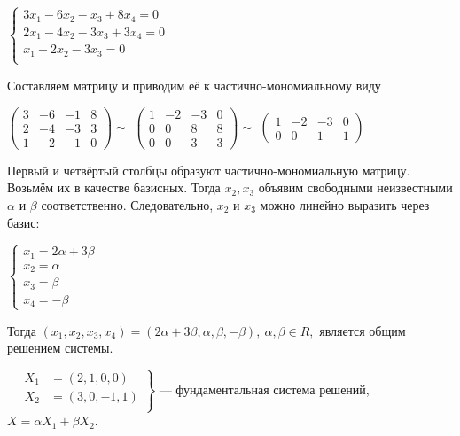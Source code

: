 \documentclass[a4paper, 12pt]{report}
\begin{document}
	$\begin{cases}
		3x_1-6x_2-x_3+8x_4=0 \\
		2x_1-4x_2-3x_3+3x_4=0 \\
		x_1-2x_2-3x_3=0 \\
	\end{cases}$
	\par\bigskip
	Составляем матрицу и приводим её к частично-мономиальному виду
	\par\bigskip
	$\begin{pmatrix} 3 & -6 & -1 & 8 \\ 2 & -4 & -3 & 3\\ 1 & -2 & -1 & 0 \end{pmatrix}\sim$
	$\begin{pmatrix} 1 & -2 & -3 & 0 \\ 0 & 0 & 8 & 8\\ 0 & 0 & 3 & 3 \end{pmatrix}\sim$
	$\begin{pmatrix} 1 & -2 & -3 & 0 \\ 0 & 0 & 1 & 1 \end{pmatrix}$
	\par\bigskip
	Первый и четвёртый столбцы образуют частично-мономиальную матрицу. Возьмём их в качестве базисных. Тогда $x_2, x_3$ объявим свободными неизвестными $\alpha$ и $\beta$ соответственно. Следовательно, $x_2$ и $x_3$ можно линейно выразить через базис:
	
	$\begin{cases}
		x_1 = 2\alpha + 3\beta \\
		x_2 = \alpha \\
		x_3 = \beta \\
		x_4 = -\beta
	\end{cases}$
	
	Тогда $(x_1,x_2,x_3,x_4) = (2\alpha + 3\beta, \alpha, \beta, -\beta), \ \alpha, \beta \in R,$ является общим решением системы.
	\par\bigskip
	$\quad\left.
	\begin{aligned}
		X_1 &= (2,1,0,0) \\
		X_2 &= (3,0,-1,1) \\
	\end{aligned}
	\right\}$ --- фундаментальная система решений, $X = \alpha X_1 + \beta X_2$.
	
\end{document}
